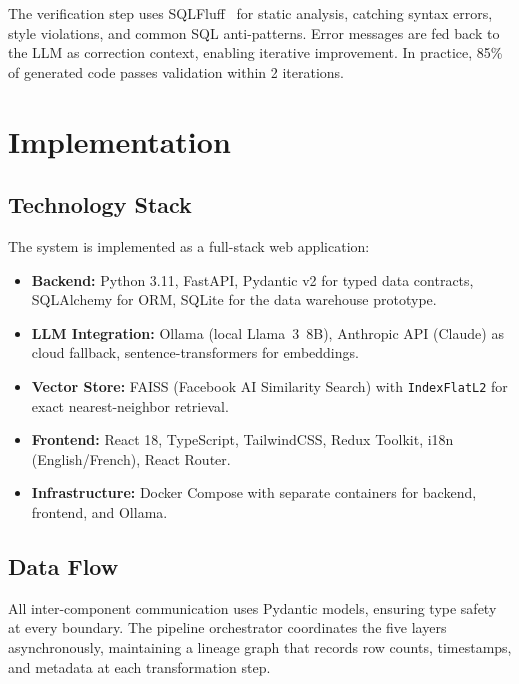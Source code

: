 \documentclass[conference]{IEEEtran}
\begin{document}
The verification step uses SQLFluff~\cite{sqlfluff} for static analysis,
catching syntax errors, style violations, and common SQL anti-patterns.
Error messages are fed back to the LLM as correction context, enabling
iterative improvement. In practice, 85\% of generated code passes validation
within 2 iterations.

\section{Implementation}
\label{sec:implementation}

\subsection{Technology Stack}

The system is implemented as a full-stack web application:

\begin{itemize}
  \item \textbf{Backend:} Python 3.11, FastAPI, Pydantic v2 for typed data
    contracts, SQLAlchemy for ORM, SQLite for the data warehouse prototype.
  \item \textbf{LLM Integration:} Ollama (local Llama~3~8B), Anthropic API
    (Claude) as cloud fallback, sentence-transformers for embeddings.
  \item \textbf{Vector Store:} FAISS (Facebook AI Similarity Search) with
    \texttt{IndexFlatL2} for exact nearest-neighbor retrieval.
  \item \textbf{Frontend:} React 18, TypeScript, TailwindCSS, Redux Toolkit,
    i18n (English/French), React Router.
  \item \textbf{Infrastructure:} Docker Compose with separate containers for
    backend, frontend, and Ollama.
\end{itemize}

\subsection{Data Flow}

All inter-component communication uses Pydantic models, ensuring type safety
at every boundary. The pipeline orchestrator coordinates the five layers
asynchronously, maintaining a lineage graph that records row counts,
timestamps, and metadata at each transformation step.
\end{document}
